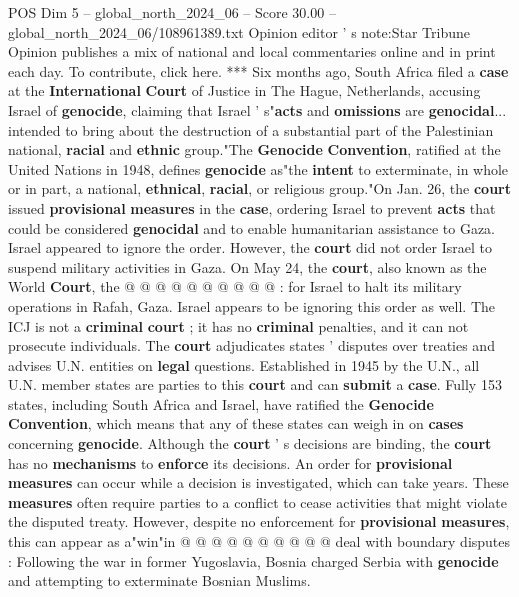 \begin{textsample}{POS Dim 5 – global\_north\_2024\_06 – Score 30.00 – global\_north\_2024\_06/108961389.txt}  \label{ex:f5_pos_311}
Opinion editor ' s note:Star Tribune Opinion publishes a mix of national and local commentaries online and in print each day.
To contribute, click here. *** Six months ago, South Africa filed a \textbf{case} at the \textbf{International} \textbf{Court} of Justice in The Hague, Netherlands, accusing Israel of \textbf{genocide}, claiming that Israel ' s"\textbf{acts} and \textbf{omissions} are \textbf{genocidal}... intended to bring about the destruction of a substantial part of the Palestinian national, \textbf{racial} and \textbf{ethnic} group."The \textbf{Genocide} \textbf{Convention}, ratified at the United Nations in 1948, defines \textbf{genocide} as"the \textbf{intent} to exterminate, in whole or in part, a national, \textbf{ethnical}, \textbf{racial}, or religious group."On Jan. 26, the \textbf{court} issued \textbf{provisional} \textbf{measures} in the \textbf{case}, ordering Israel to prevent \textbf{acts} that could be considered \textbf{genocidal} and to enable humanitarian assistance to Gaza.
Israel appeared to ignore the order.
However, the \textbf{court} did not order Israel to suspend military activities in Gaza.
On May 24, the \textbf{court}, also known as the World \textbf{Court}, the @ @ @ @ @ @ @ @ @ @ : for Israel to halt its military operations in Rafah, Gaza.
Israel appears to be ignoring this order as well.
The ICJ is not a \textbf{criminal} \textbf{court} ; it has no \textbf{criminal} penalties, and it can not prosecute individuals.
The \textbf{court} adjudicates states ' disputes over treaties and advises U.N. entities on \textbf{legal} questions.
Established in 1945 by the U.N., all U.N. member states are parties to this \textbf{court} and can \textbf{submit} a \textbf{case}.
Fully 153 states, including South Africa and Israel, have ratified the \textbf{Genocide} \textbf{Convention}, which means that any of these states can weigh in on \textbf{cases} concerning \textbf{genocide}.
Although the \textbf{court} ' s decisions are binding, the \textbf{court} has no \textbf{mechanisms} to \textbf{enforce} its decisions.
An order for \textbf{provisional} \textbf{measures} can occur while a decision is investigated, which can take years.
These \textbf{measures} often require parties to a conflict to cease activities that might violate the disputed treaty.
However, despite no enforcement for \textbf{provisional} \textbf{measures}, this can appear as a"win"in @ @ @ @ @ @ @ @ @ @ deal with boundary disputes : Following the war in former Yugoslavia, Bosnia charged Serbia with \textbf{genocide} and attempting to exterminate Bosnian Muslims.

\end{textsample}
